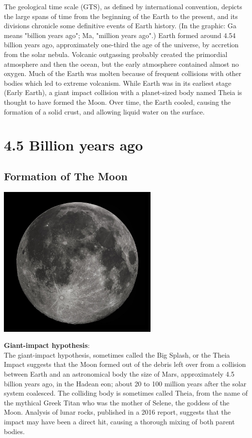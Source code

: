 \documentclass[11pt]{report}
\begin{document}
The geological time scale (GTS), as defined by international convention, depicts the large spans of time from the beginning of the Earth to the present, and its divisions chronicle some definitive events of Earth history. (In the graphic: Ga means "billion years ago"; Ma, "million years ago".) Earth formed around 4.54 billion years ago, approximately one-third the age of the universe, by accretion from the solar nebula. Volcanic outgassing probably created the primordial atmosphere and then the ocean, but the early atmosphere contained almost no oxygen. Much of the Earth was molten because of frequent collisions with other bodies which led to extreme volcanism. While Earth was in its earliest stage (Early Earth), a giant impact collision with a planet-sized body named Theia is thought to have formed the Moon. Over time, the Earth cooled, causing the formation of a solid crust, and allowing liquid water on the surface.

\chapter{4.5 Billion years ago}
\section{Formation of The Moon}
\vspace{2mm}\begin{center}\includegraphics[width=8cm]{./img/moon.jpg}\end{center}
\textbf{Giant-impact hypothesis}:\\
The giant-impact hypothesis, sometimes called the Big Splash, or the Theia Impact suggests that the Moon formed out of the debris left over from a collision between Earth and an astronomical body the size of Mars, approximately 4.5 billion years ago, in the Hadean eon; about 20 to 100 million years after the solar system coalesced. The colliding body is sometimes called Theia, from the name of the mythical Greek Titan who was the mother of Selene, the goddess of the Moon. Analysis of lunar rocks, published in a 2016 report, suggests that the impact may have been a direct hit, causing a thorough mixing of both parent bodies.
\end{document}
